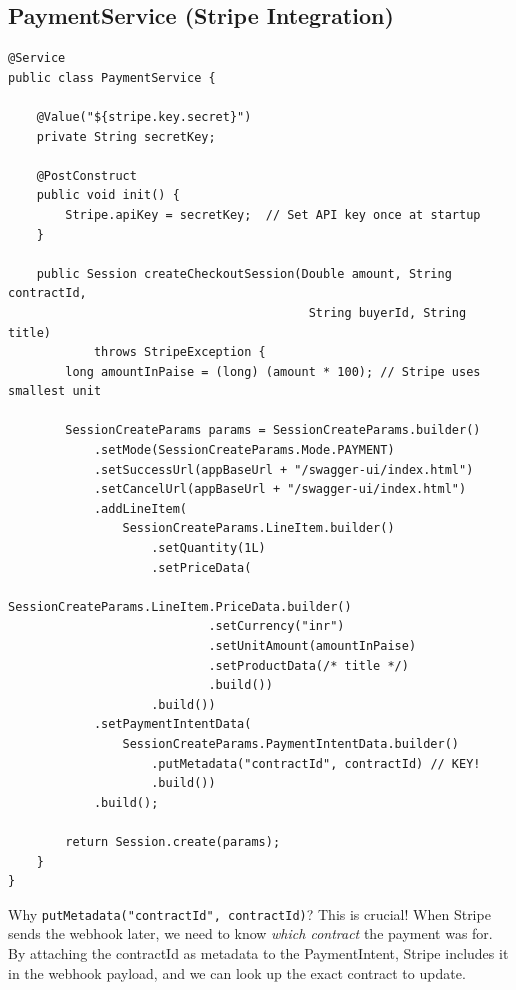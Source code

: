 \documentclass[11pt, a4paper]{article}
\begin{document}
\subsection{PaymentService (Stripe Integration)}

\begin{lstlisting}[caption={PaymentService.java -- Creating a Stripe Checkout Session}]
@Service
public class PaymentService {

    @Value("${stripe.key.secret}")
    private String secretKey;

    @PostConstruct
    public void init() {
        Stripe.apiKey = secretKey;  // Set API key once at startup
    }

    public Session createCheckoutSession(Double amount, String contractId,
                                          String buyerId, String title)
            throws StripeException {
        long amountInPaise = (long) (amount * 100); // Stripe uses smallest unit

        SessionCreateParams params = SessionCreateParams.builder()
            .setMode(SessionCreateParams.Mode.PAYMENT)
            .setSuccessUrl(appBaseUrl + "/swagger-ui/index.html")
            .setCancelUrl(appBaseUrl + "/swagger-ui/index.html")
            .addLineItem(
                SessionCreateParams.LineItem.builder()
                    .setQuantity(1L)
                    .setPriceData(
                        SessionCreateParams.LineItem.PriceData.builder()
                            .setCurrency("inr")
                            .setUnitAmount(amountInPaise)
                            .setProductData(/* title */)
                            .build())
                    .build())
            .setPaymentIntentData(
                SessionCreateParams.PaymentIntentData.builder()
                    .putMetadata("contractId", contractId) // KEY!
                    .build())
            .build();

        return Session.create(params);
    }
}
\end{lstlisting}

\begin{warningbox}{Why \texttt{putMetadata("contractId", contractId)}?}
This is crucial! When Stripe sends the webhook later, we need to know \textit{which contract} the payment was for. By attaching the contractId as metadata to the PaymentIntent, Stripe includes it in the webhook payload, and we can look up the exact contract to update.
\end{warningbox}
\end{document}
